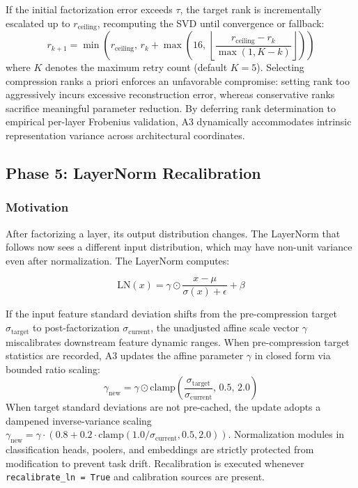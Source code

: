 If the initial factorization error exceeds $\tau$, the target rank is incrementally escalated up to $r_{\mathrm{ceiling}}$, recomputing the SVD until convergence or fallback:
\begin{equation}
r_{k+1} = \min\!\left(r_{\mathrm{ceiling}},\, r_k + \max\!\left(16,\, \left\lfloor\frac{r_{\mathrm{ceiling}} - r_k}{\max(1, K - k)}\right\rfloor\right)\right)
\tag{4.11}
\end{equation}
where $K$ denotes the maximum retry count (default $K=5$). Selecting compression ranks a priori enforces an unfavorable compromise: setting rank too aggressively incurs excessive reconstruction error, whereas conservative ranks sacrifice meaningful parameter reduction. By deferring rank determination to empirical per-layer Frobenius validation, A3 dynamically accommodates intrinsic representation variance across architectural coordinates.

\subsection{Phase 5: LayerNorm Recalibration}
\label{sec:layernorm_recalibration}

\subsubsection{Motivation}

After factorizing a layer, its output distribution changes. The LayerNorm 
that follows now sees a different input distribution, which may have 
non-unit variance even after normalization. The LayerNorm computes:

\[
\text{LN}(x) = \gamma \odot \frac{x - \mu}{\sigma(x) + \epsilon} + \beta
\tag{4.12}
\]

If the input feature standard deviation shifts from the pre-compression target $\sigma_{\mathrm{target}}$ to post-factorization $\sigma_{\mathrm{current}}$, the unadjusted affine scale vector $\gamma$ miscalibrates downstream feature dynamic ranges. When pre-compression target statistics are recorded, A3 updates the affine parameter $\gamma$ in closed form via bounded ratio scaling:
\begin{equation}
\gamma_{\mathrm{new}} = \gamma \odot \mathrm{clamp}\!\left(\frac{\sigma_{\mathrm{target}}}{\sigma_{\mathrm{current}}},\, 0.5,\, 2.0\right)
\tag{4.13}
\end{equation}
When target standard deviations are not pre-cached, the update adopts a dampened inverse-variance scaling $\gamma_{\mathrm{new}} = \gamma \cdot (0.8 + 0.2 \cdot \mathrm{clamp}(1.0/\sigma_{\mathrm{current}}, 0.5, 2.0))$. Normalization modules in classification heads, poolers, and embeddings are strictly protected from modification to prevent task drift. Recalibration is executed whenever \texttt{recalibrate\_ln = True} and calibration sources are present.

